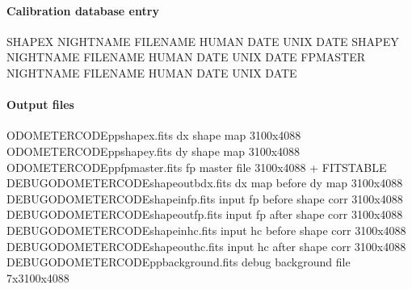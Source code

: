 \documentclass[a4paper,10pt,english]{report}
\begin{document}
\paragraph{Calibration database entry}
\label{\detokenize{user/spirou/recipes/shape_master:calibration-database-entry}}
\begin{sphinxVerbatim}[commandchars=\\\{\}]
SHAPEX NIGHT\PYGZus{}NAME FILENAME HUMAN DATE UNIX DATE
SHAPEY NIGHT\PYGZus{}NAME FILENAME HUMAN DATE UNIX DATE
FPMASTER NIGHT\PYGZus{}NAME FILENAME HUMAN DATE UNIX DATE
\end{sphinxVerbatim}


\paragraph{Output files}
\label{\detokenize{user/spirou/recipes/shape_master:output-files}}
\begin{sphinxVerbatim}[commandchars=\\\{\}]
ODOMETER\PYGZus{}CODE\PYGZus{}pp\PYGZus{}shapex.fits             dx shape map 3100x4088
ODOMETER\PYGZus{}CODE\PYGZus{}pp\PYGZus{}shapey.fits             dy shape map 3100x4088
ODOMETER\PYGZus{}CODE\PYGZus{}pp\PYGZus{}fpmaster.fits           fp master file 3100x4088 + FITS\PYGZhy{}TABLE
DEBUG\PYGZus{}ODOMETER\PYGZus{}CODE\PYGZus{}shape\PYGZus{}out\PYGZus{}bdx.fits   dx map before dy map 3100x4088
DEBUG\PYGZus{}ODOMETER\PYGZus{}CODE\PYGZus{}shape\PYGZus{}in\PYGZus{}fp.fits     input fp before shape corr 3100x4088
DEBUG\PYGZus{}ODOMETER\PYGZus{}CODE\PYGZus{}shape\PYGZus{}out\PYGZus{}fp.fits    input fp after shape corr 3100x4088
DEBUG\PYGZus{}ODOMETER\PYGZus{}CODE\PYGZus{}shape\PYGZus{}in\PYGZus{}hc.fits     input hc before shape corr 3100x4088
DEBUG\PYGZus{}ODOMETER\PYGZus{}CODE\PYGZus{}shape\PYGZus{}out\PYGZus{}hc.fits    input hc after shape corr 3100x4088
DEBUG\PYGZus{}ODOMETER\PYGZus{}CODE\PYGZus{}pp\PYGZus{}background.fits  debug background file 7x3100x4088
\end{sphinxVerbatim}
\end{document}
